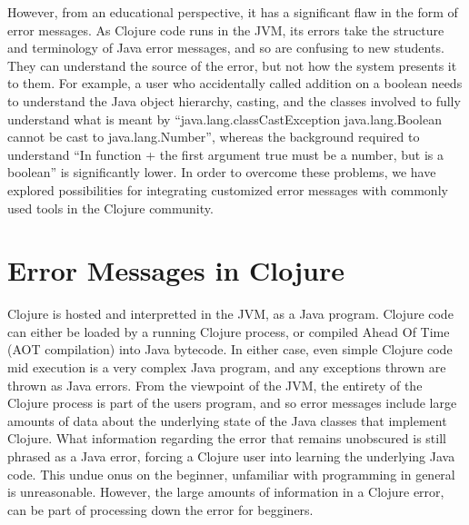 \documentclass[12pt]{article}
\newcommand{\comment}[1]{{\bf \tt  {#1}}}
\newcommand{\emcomment}[1]{\textcolor{ForestGreen}{\comment{Elena: {#1}}}}
\begin{document}
However, from an educational perspective, it has a significant flaw in the form of error messages.
As Clojure code runs in the JVM, its errors take the structure and terminology of Java error messages,
and so are confusing to new students. They can understand the source of the error,
but not how the system presents it to them.
For example, a user who accidentally called addition on a boolean needs
 to understand the Java object hierarchy, casting,
 and the classes involved to fully understand what is meant by
 ``java.lang.classCastException java.lang.Boolean cannot be cast to java.lang.Number'',
whereas the background required to understand ``In function + the first argument true must be a number, but is a boolean''
 is significantly lower.
 In order to overcome these problems,
 we have explored possibilities for integrating customized error messages with commonly used tools in the Clojure community.




\section{Error Messages in Clojure}
Clojure is hosted and interpretted in the JVM, as a Java program.
Clojure code can either be loaded by a running Clojure process, or
compiled Ahead Of Time (AOT compilation) into Java bytecode. In either case,
even simple Clojure code mid execution is a very complex Java program,
and any exceptions thrown are thrown as Java errors.
From the viewpoint of the JVM, the entirety of the Clojure process is
part of the users program, and so error messages include large amounts
of data about the underlying state of the Java classes that implement Clojure.
What information regarding the error that remains unobscured is still
phrased as a Java error, forcing a Clojure user into learning
the underlying Java code. This undue onus on the beginner,
unfamiliar with programming in general is unreasonable.
However, the large amounts of information in a Clojure error,
can be part of processing down the error for begginers.
\end{document}
